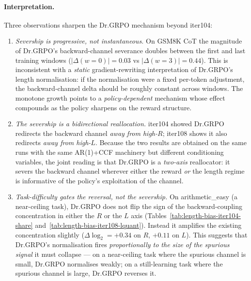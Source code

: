\paragraph{Interpretation.}
Three observations sharpen the Dr.GRPO mechanism beyond iter104:

\begin{enumerate}
\item \emph{Severship is progressive, not instantaneous.}
On GSM8K CoT the magnitude of Dr.GRPO's backward-channel severance
doubles between the first and last training windows
($|\Delta(w{=}0)|=0.03$ vs $|\Delta(w{=}3)|=0.44$).  This is
inconsistent with a \emph{static} gradient-rewriting interpretation
of Dr.GRPO's length normalisation: if the normalisation were a fixed
per-token adjustment, the backward-channel delta should be roughly
constant across windows.  The monotone growth points to a
\emph{policy-dependent} mechanism whose effect compounds as the
policy sharpens on the reward structure.

\item \emph{The severship is a \emph{bidirectional reallocation}.}
iter104 showed Dr.GRPO redirects the backward channel \emph{away from
high-$R$}; iter108 shows it also redirects \emph{away from high-$L$}.
Because the two results are obtained on the same runs with the same
AR(1)+CCF machinery but different conditioning variables, the joint
reading is that Dr.GRPO is a \emph{two-axis} reallocator: it severs
the backward channel wherever either the reward \emph{or} the length
regime is informative of the policy's exploitation of the channel.

\item \emph{Task-difficulty gates the reversal, not the severship.}
On arithmetic\_easy (a near-ceiling task), Dr.GRPO does not flip the
sign of the backward-coupling concentration in either the $R$ or the
$L$ axis (Tables~\ref{tab:length-bias-iter104-share}
and~\ref{tab:length-bias-iter108-lquant}).  Instead it amplifies the
existing concentration slightly ($\Delta\log_2=+0.34$ on $R$,
$+0.11$ on $L$).  This suggests that Dr.GRPO's normalisation fires
\emph{proportionally to the size of the spurious signal} it must
collapse --- on a near-ceiling task where the spurious channel is
small, Dr.GRPO normalises weakly; on a still-learning task where
the spurious channel is large, Dr.GRPO reverses it.
\end{enumerate}

